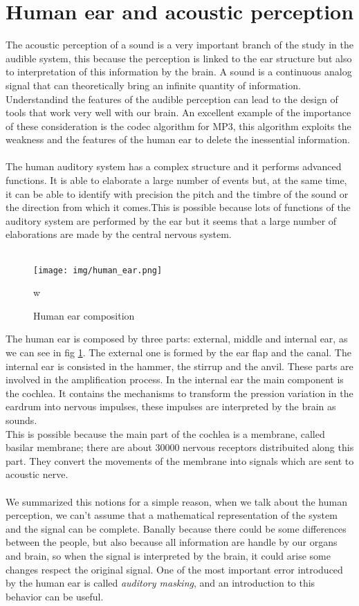 \section{Human ear and acoustic perception}
The acoustic perception of a sound is a very important branch of the study in the audible system, this because the perception is linked to the ear structure but also to interpretation of this information by the brain. A sound is a continuous analog signal that can theoretically bring an infinite quantity of information.\\
Understandind the features of the audible perception can lead to the design of tools that work very well with our brain.
An excellent example of the importance of these consideration is the codec algorithm  for MP3, this algorithm exploits the weakness and the features of the human ear to delete the inessential information.\\\\
The human auditory system has a complex structure and it performs advanced functions. It is able to elaborate a large number of events but, at the same time, it can be able to identify with precision the pitch and the timbre of the sound or the direction from which it comes.This is possible because lots of functions of the auditory system are performed by the ear but it seems that a large number of elaborations are made by the central nervous system.\\\\
\begin{figure}[h]\centering
\texttt{[image: img/human\_ear.png]} 
\caption{Human ear composition} \label{fig:humanear}w
\end{figure}
The human ear is composed by three parts: external, middle and internal ear, as we can see in fig \ref{fig:humanear}. The external one is formed by the ear flap and the canal. The internal ear is consisted in the hammer, the stirrup and the anvil. These parts are involved in the amplification process.
In the internal ear the main component is the cochlea. It contains the mechanisms to transform the pression variation in the eardrum into nervous impulses, these impulses are interpreted by the brain as sounds.\\
This is possible because the main part of the cochlea is a membrane, called basilar membrane; there are about 30000 nervous receptors distribuited along this part. They convert the movements of the membrane into signals which are sent to acoustic nerve.\\\\
We summarized this notions for a simple reason, when we talk about the human perception, we can't assume that a mathematical representation of the system and the signal can be complete. Banally because there could be some differences between the people, but also because all information are handle by our organs and brain, so when the signal is interpreted by the brain, it could arise some changes respect the original signal.
One of the most important error introduced by the human ear is called \textit{auditory masking}, and an introduction to this behavior can be useful.
